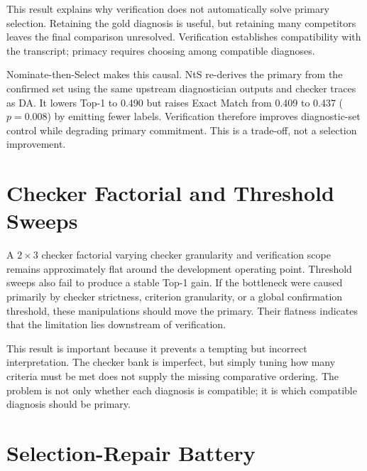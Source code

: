 
This result explains why verification does not automatically solve primary selection. Retaining the gold diagnosis is useful, but retaining many competitors leaves the final comparison unresolved. Verification establishes compatibility with the transcript; primacy requires choosing among compatible diagnoses.

Nominate-then-Select makes this causal. NtS re-derives the primary from the confirmed set using the same upstream diagnostician outputs and checker traces as DA. It lowers Top-1 to 0.490 but raises Exact Match from 0.409 to 0.437 ($p=0.008$) by emitting fewer labels. Verification therefore improves diagnostic-set control while degrading primary commitment. This is a trade-off, not a selection improvement.

\section{Checker Factorial and Threshold Sweeps}

A $2\times3$ checker factorial varying checker granularity and verification scope remains approximately flat around the development operating point. Threshold sweeps also fail to produce a stable Top-1 gain. If the bottleneck were caused primarily by checker strictness, criterion granularity, or a global confirmation threshold, these manipulations should move the primary. Their flatness indicates that the limitation lies downstream of verification.

This result is important because it prevents a tempting but incorrect interpretation. The checker bank is imperfect, but simply tuning how many criteria must be met does not supply the missing comparative ordering. The problem is not only whether each diagnosis is compatible; it is which compatible diagnosis should be primary.

\section{Selection-Repair Battery}


